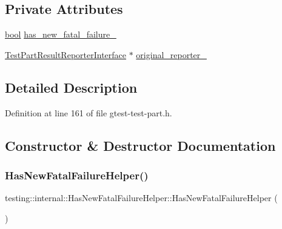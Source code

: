 \subsection*{Private Attributes}
\begin{DoxyCompactItemize}
\item 
\hyperlink{classbool}{bool} \hyperlink{classtesting_1_1internal_1_1HasNewFatalFailureHelper_a172103f6aefee8c387a44679888fee30}{has\+\_\+new\+\_\+fatal\+\_\+failure\+\_\+}
\item 
\hyperlink{classtesting_1_1TestPartResultReporterInterface}{Test\+Part\+Result\+Reporter\+Interface} $\ast$ \hyperlink{classtesting_1_1internal_1_1HasNewFatalFailureHelper_a9f8be46b6aa39666e4a8557f240629e5}{original\+\_\+reporter\+\_\+}
\end{DoxyCompactItemize}


\subsection{Detailed Description}


Definition at line 161 of file gtest-\/test-\/part.\+h.



\subsection{Constructor \& Destructor Documentation}
\mbox{\label{classtesting_1_1internal_1_1HasNewFatalFailureHelper_a59190a7188db558c00b4c6bf9251859a}} 
\subsubsection{\texorpdfstring{Has\+New\+Fatal\+Failure\+Helper()}{HasNewFatalFailureHelper()}}
{\footnotesize\ttfamily testing\+::internal\+::\+Has\+New\+Fatal\+Failure\+Helper\+::\+Has\+New\+Fatal\+Failure\+Helper (\begin{DoxyParamCaption}{ }\end{DoxyParamCaption})}



